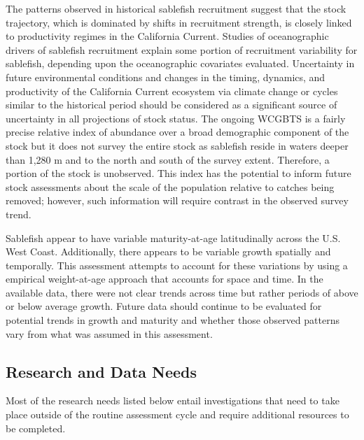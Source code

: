 \documentclass[
  english,
]{article}
\begin{document}
The patterns observed in historical sablefish recruitment suggest that
the stock trajectory, which is dominated by shifts in recruitment
strength, is closely linked to productivity regimes in the California
Current. Studies of oceanographic drivers of sablefish recruitment
explain some portion of recruitment variability for sablefish, depending
upon the oceanographic covariates evaluated. Uncertainty in future
environmental conditions and changes in the timing, dynamics, and
productivity of the California Current ecosystem via climate change or
cycles similar to the historical period should be considered as a
significant source of uncertainty in all projections of stock status.
The ongoing WCGBTS is a fairly precise relative index of abundance over
a broad demographic component of the stock but it does not survey the
entire stock as sablefish reside in waters deeper than 1,280 m and to
the north and south of the survey extent. Therefore, a portion of the
stock is unobserved. This index has the potential to inform future stock
assessments about the scale of the population relative to catches being
removed; however, such information will require contrast in the observed
survey trend.

Sablefish appear to have variable maturity-at-age latitudinally across
the U.S. West Coast. Additionally, there appears to be variable growth
spatially and temporally. This assessment attempts to account for these
variations by using a empirical weight-at-age approach that accounts for
space and time. In the available data, there were not clear trends
across time but rather periods of above or below average growth. Future
data should continue to be evaluated for potential trends in growth and
maturity and whether those observed patterns vary from what was assumed
in this assessment.

\subsection*{Research and Data Needs}\label{research-and-data-needs}

Most of the research needs listed below entail investigations that need
to take place outside of the routine assessment cycle and require
additional resources to be completed.
\end{document}
